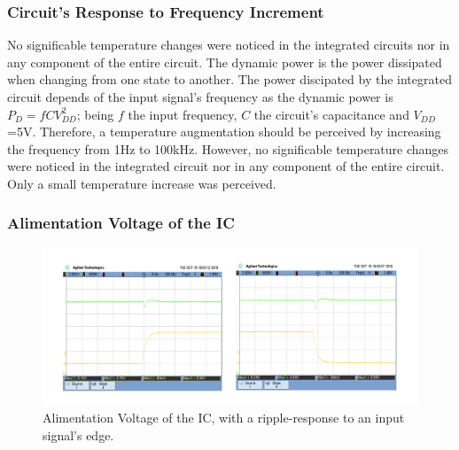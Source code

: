 \documentclass[a4paper,11pt]{report}
\begin{document}
\subsubsection{\color{red}Circuit's Response to Frequency Increment}

No significable temperature changes were noticed in the integrated circuits nor in any component of the entire circuit.
The dynamic power is the power dissipated when changing from one state to another. The power discipated by the integrated circuit depends of the input signal's frequency as the dynamic power is $P_{D}=fCV_{DD}^{2}$; being $f$ the input frequency, $C$ the circuit's capacitance and $V_{DD}$=5V. Therefore, a temperature augmentation should be perceived by increasing the frequency from 1Hz to 100kHz. However, no significable temperature changes were noticed in the integrated circuit nor in any component of the entire circuit. Only a small temperature increase was perceived.



\subsubsection{\color{red}Alimentation Voltage of the IC}

\begin{figure}[h!]
\centering
\includegraphics[scale=0.7]{../Exercise4/scap}
\caption{Alimentation Voltage of the IC, with a ripple-response to an input signal's edge.}
\label{scap}
\end{figure}
\end{document}
